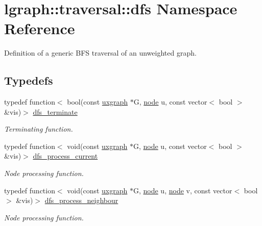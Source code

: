 \hypertarget{namespacelgraph_1_1traversal_1_1dfs}{}\section{lgraph\+:\+:traversal\+:\+:dfs Namespace Reference}
\label{namespacelgraph_1_1traversal_1_1dfs}


Definition of a generic B\+FS traversal of an unweighted graph.  


\subsection*{Typedefs}
\begin{DoxyCompactItemize}
\item 
typedef function$<$ bool(const \hyperlink{classlgraph_1_1utils_1_1uxgraph}{uxgraph} $\ast$G, \hyperlink{namespacelgraph_1_1utils_a7bd66ede3805ef121bc2835bd48de0cf}{node} u, const vector$<$ bool $>$ \&vis)$>$ \hyperlink{namespacelgraph_1_1traversal_1_1dfs_a41b39b9a31fd3665c970a6eb70564765}{dfs\+\_\+terminate}
\begin{DoxyCompactList}\small\item\em Terminating function. \end{DoxyCompactList}\item 
typedef function$<$ void(const \hyperlink{classlgraph_1_1utils_1_1uxgraph}{uxgraph} $\ast$G, \hyperlink{namespacelgraph_1_1utils_a7bd66ede3805ef121bc2835bd48de0cf}{node} u, const vector$<$ bool $>$ \&vis)$>$ \hyperlink{namespacelgraph_1_1traversal_1_1dfs_a918161e9face694d4ebdc4ba13cdd5ac}{dfs\+\_\+process\+\_\+current}
\begin{DoxyCompactList}\small\item\em Node processing function. \end{DoxyCompactList}\item 
typedef function$<$ void(const \hyperlink{classlgraph_1_1utils_1_1uxgraph}{uxgraph} $\ast$G, \hyperlink{namespacelgraph_1_1utils_a7bd66ede3805ef121bc2835bd48de0cf}{node} u, \hyperlink{namespacelgraph_1_1utils_a7bd66ede3805ef121bc2835bd48de0cf}{node} v, const vector$<$ bool $>$ \&vis)$>$ \hyperlink{namespacelgraph_1_1traversal_1_1dfs_af04d72933b75432a505b1235d173da4b}{dfs\+\_\+process\+\_\+neighbour}
\begin{DoxyCompactList}\small\item\em Node processing function. \end{DoxyCompactList}\end{DoxyCompactItemize}
